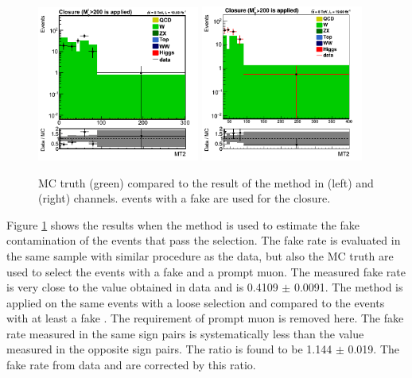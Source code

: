 \begin{figure}[!Hhtb]
\centering
\includegraphics[width=0.475\textwidth,keepaspectratio=true]{FakeRateMuTau/Estimation_pfWJets_ExtraLepExcl_SameSignWeightedHiggs_tauMTApplied.png}
\includegraphics[width=0.475\textwidth,keepaspectratio=true]{FakeRateEleTau/closure_eletau_taumt200.png}
\caption{MC truth (green) compared to the result of the method in \muTau (left) and \eTau (right) channels. \wjets events with a fake \Tau are used for the closure.}
\label{fig:LepTauClusure}
\end{figure}
Figure \ref{fig:LepTauClusure} shows the results when the method is used to estimate the fake contamination of the \wjets events 
that pass the selection. 
The fake rate is evaluated in the same sample with similar procedure as the data, but  
also the MC truth are used to select the events with a fake \Tau and a prompt muon. 
The measured fake rate is very close to the value obtained in data and is 0.4109 $\pm$  0.0091. 
The method is applied on the same events with a loose \Tau selection and compared to the \wjets events with at least 
a fake \Tau. The requirement of prompt muon is removed here.
The fake rate measured in the same sign pairs is systematically less than the value 
measured in the opposite sign pairs. The ratio is found to be 1.144 $\pm$ 0.019. The fake rate from data and \wjets are corrected by this ratio.
